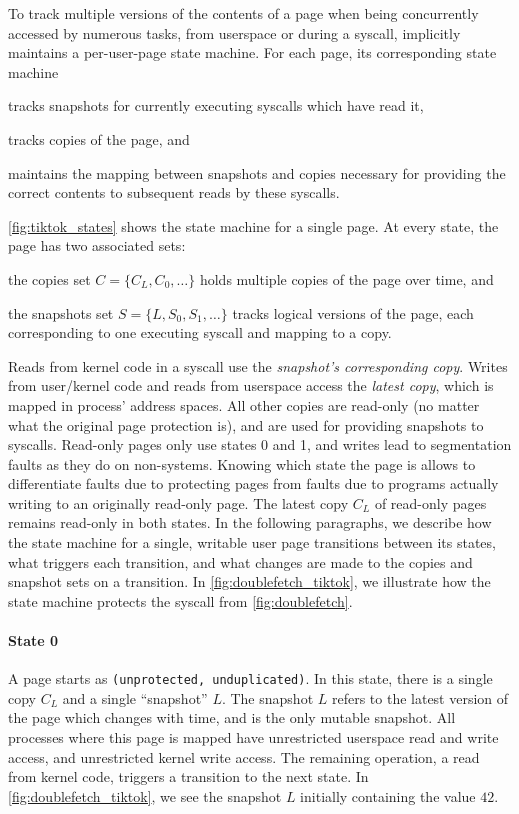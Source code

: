 \documentclass[letterpaper,twocolumn,10pt, anonymous]{article}
\begin{document}
To track multiple versions of the contents of a page when being concurrently 
accessed by numerous tasks, from userspace or during a syscall,
\tiktok implicitly maintains a per-user-page state machine.
For each page, its corresponding state machine 
\begin{inparaenum}
  \item tracks snapshots for currently executing syscalls which have read it, 
  \item tracks copies of the page, and 
  \item maintains the mapping between snapshots and copies necessary for providing 
  the correct contents to subsequent reads by these syscalls.
\end{inparaenum}

\autoref{fig:tiktok_states} shows the state machine for a single page.
At every state, the page has two associated sets:
\begin{inparaenum}
  \item the copies set $C = \{C_L, C_0, \dots\}$ holds multiple copies of the page over time, and
  \item the snapshots set $S = \{L, S_0, S_1, \dots\}$ tracks logical versions of the page, each corresponding to one executing syscall and mapping to a copy. 
\end{inparaenum}
Reads from kernel code in a syscall use the \emph{snapshot's corresponding copy}.
Writes from user/kernel code and reads from userspace access the \emph{latest 
copy}, which is mapped in process' address spaces.
All other copies are read-only (no matter what the original page protection is), and are used for providing snapshots to syscalls.
Read-only pages only use states 0 and 1, and writes lead to segmentation faults
as they do on non-\tiktok systems.
Knowing which state the page is allows \tiktok to differentiate faults due
to protecting pages from faults due to programs actually writing to an 
originally read-only page.
The latest copy $C_L$ of read-only pages remains read-only in both states.
In the following paragraphs, we describe how the state machine for a single, 
writable user page transitions between its states, what triggers each transition, 
and what changes are made to the copies and snapshot sets on a transition.
In \autoref{fig:doublefetch_tiktok}, we illustrate how the state machine protects the 
syscall from \autoref{fig:doublefetch}.

\paragraph{State 0}
A page starts as \texttt{(unprotected, unduplicated)}.
In this state, there is a single copy $C_L$ and a single ``snapshot'' $L$. 
The snapshot $L$ refers to the latest version of the page which changes 
with time, and is the only mutable snapshot.
All processes where this page is mapped have unrestricted userspace read and write 
access, and unrestricted kernel write access.
The remaining operation, a read from kernel code, triggers a transition to 
the next state.
In \autoref{fig:doublefetch_tiktok}, we see the snapshot $L$ initially containing 
the value $42$.
\end{document}
